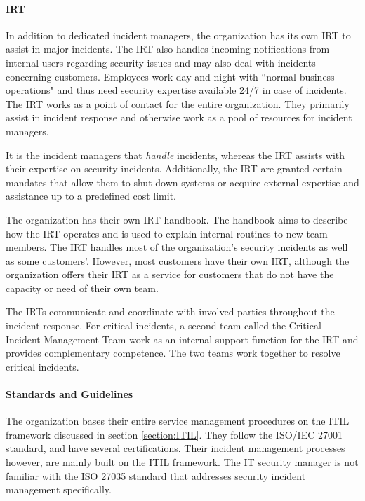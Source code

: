 \paragraph{\acl{IRT}}
In addition to dedicated incident managers, the organization has its own \ac{IRT} to assist in major incidents. The \ac{IRT} also handles incoming notifications from internal users regarding security issues and may also deal with incidents concerning customers. Employees work day and night with ``normal business operations" and thus need security expertise available 24/7 in case of incidents. The \ac{IRT} works as a point of contact for the entire organization. They primarily assist in incident response and otherwise work as a pool of resources for incident managers. 

It is the incident managers that \emph{handle} incidents, whereas the \ac{IRT} assists with their expertise on security incidents. Additionally, the \ac{IRT} are granted certain mandates that allow them to shut down systems or acquire external expertise and assistance up to a predefined cost limit.    

The organization has their own \ac{IRT} handbook. The handbook aims to describe how the \ac{IRT} operates and is used to explain internal routines to new team members. The \ac{IRT} handles most of the organization's security incidents as well as some customers'. However, most customers have their own \ac{IRT}, although the organization offers their \ac{IRT} as a service for customers that do not have the capacity or need of their own team.

The \acp{IRT} communicate and coordinate with involved parties throughout the incident response. For critical incidents, a second team called the Critical Incident Management Team work as an internal support function for the \ac{IRT} and provides complementary competence. The two teams work together to resolve critical incidents. 

\paragraph{Standards and Guidelines}
The organization bases their entire service management procedures on the ITIL framework discussed in section \ref{section:ITIL}. They follow the ISO/IEC 27001 standard, and have several certifications. Their incident management processes however, are mainly built on the ITIL framework. The IT security manager is not familiar with the ISO 27035 standard that addresses security incident management specifically. 

